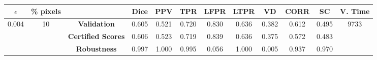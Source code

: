 \begin{longtable}{ c  c | c | c  c  c  c  c  c  c c c}
\toprule \textbf{$\epsilon$} & \textbf{\% pixels} & & \textbf{Dice} & \textbf{PPV} & \textbf{TPR} & \textbf{LFPR} & \textbf{LTPR} & \textbf{VD} & \textbf{CORR} & \textbf{SC} & \textbf{V. Time} \\
\midrule 
\multirow{3}{*}{0.004}  & \multirow{3}{*}{10} &\textbf{Validation} & 0.605 & 0.521 & 0.720 & 0.830 & 0.636 & 0.382 & 0.612 & 0.495 & \multirow{3}{*}{9733} \\
 & & \textbf{Certified Scores} & 0.606 & 0.523 & 0.719 & 0.839 & 0.636 & 0.375 & 0.572 & 0.483 & \\
& & \textbf{Robustness} & 0.997 & 1.000 & 0.995 & 0.056 & 1.000 & 0.005 & 0.937 & 0.970 & \\
\end{longtable}